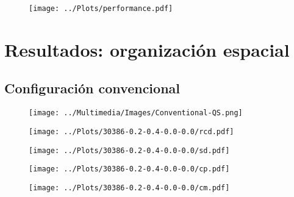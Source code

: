 \documentclass{beamer}
\begin{document}
\begin{frame}
    \begin{figure}
        \centering
        \texttt{[image: ../Plots/performance.pdf]}
    \end{figure}
\end{frame}

\section{Resultados: organización espacial}

\subsection{Configuración convencional}

\begin{frame}
    \begin{figure}
        \centering
        \texttt{[image: ../Multimedia/Images/Conventional-QS.png]}
    \end{figure}
\end{frame}

\begin{frame}
    \begin{figure}
        \centering
        \texttt{[image: ../Plots/30386-0.2-0.4-0.0-0.0/rcd.pdf]}
    \end{figure}
\end{frame}

\begin{frame}
    \begin{figure}
        \centering
        \texttt{[image: ../Plots/30386-0.2-0.4-0.0-0.0/sd.pdf]}
    \end{figure}
\end{frame}

\begin{frame}
    \begin{figure}
        \centering
        \texttt{[image: ../Plots/30386-0.2-0.4-0.0-0.0/cp.pdf]}
    \end{figure}
\end{frame}

\begin{frame}
    \begin{figure}
        \centering
        \texttt{[image: ../Plots/30386-0.2-0.4-0.0-0.0/cm.pdf]}
    \end{figure}
\end{frame}
\end{document}
